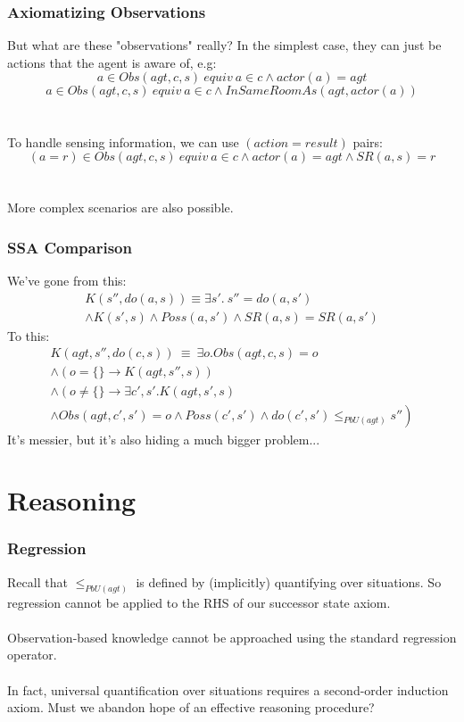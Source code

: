 \documentclass{beamer}
\begin{document}
\begin{frame}
\frametitle{Axiomatizing Observations}
But what are these "observations" really?  In the simplest case, they
can just be actions that the agent is aware of, e.g:
\begin{equation*}
a \in Obs(agt,c,s)\ equiv\ a \in c \wedge actor(a) = agt
\end{equation*}
\begin{equation*}
a \in Obs(agt,c,s)\ equiv\ a \in c \wedge InSameRoomAs(agt,actor(a))
\end{equation*}
\ \\
\ \\
\pause
To handle sensing information, we can use $(action = result)$ pairs:
\begin{equation*}
(a=r) \in Obs(agt,c,s)\ equiv\ a \in c \wedge actor(a) = agt \wedge SR(a,s) = r
\end{equation*}
\ \\
\ \\
More complex scenarios are also possible.
\end{frame}

\begin{frame}
\frametitle{SSA Comparison}
We've gone from this:
\begin{multline*}
 K(s'',do(a,s)) \equiv \exists s' . \ s''=do(a,s') \\
 \wedge K(s',s) \wedge Poss(a,s') \wedge SR(a,s) = SR(a,s')
\end{multline*}
\pause
To this:
\begin{multline*}
  K(agt,s'',do(c,s))\ \equiv\ \exists o . Obs(agt,c,s) = o  \\
  \wedge \left(o = \{\} \rightarrow K(agt,s'',s)\right) \\
  \wedge \left(o \neq \{\} \rightarrow \exists c',s' . K(agt,s',s)\right. \\
  \left.\wedge Obs(agt,c',s') = o \wedge Poss(c',s') \wedge do(c',s') \leq_{PbU(agt)} s''\right)
\end{multline*}
\pause
It's messier, but it's also hiding a much bigger problem...
\end{frame}

\section{Reasoning}

\begin{frame}
\frametitle{Regression}
Recall that $\leq_{PbU(agt)}$ is defined by (implicitly) quantifying over
situations. So regression cannot be applied to the RHS of our successor state
axiom.
\ \\
\ \\
Observation-based knowledge \alert{cannot} be approached using
the standard regression operator.
\ \\
\ \\
\pause
In fact, universal quantification over situations requires a
second-order induction axiom.
Must we abandon hope of an effective reasoning procedure?
\end{frame}
\end{document}
